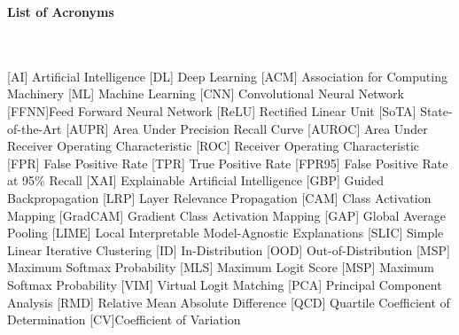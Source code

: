 \documentclass[UKenglish]{uiomasterthesis} %
\theoremstyle{definition}
\begin{document}


\tableofcontents{}

\newpage

\thispagestyle{plain}
{\noindent \Huge {}\selectfont \textbf{List of Acronyms}}
\\
\\
\\

\begin{acronym}[ICANN]
       [AI]   {Artificial Intelligence}
       [DL]   {Deep Learning}
     [ACM] {Association for Computing Machinery}
       [ML]   {Machine Learning}
       [CNN]   {Convolutional Neural Network}
    [FFNN]{Feed Forward Neural Network}
       [ReLU]   {Rectified Linear Unit}
       [SoTA]   {State-of-the-Art}
       [AUPR]   {Area Under Precision Recall Curve}
       [AUROC]   {Area Under Receiver Operating Characteristic}
       [ROC]   {Receiver Operating Characteristic}
       [FPR]   {False Positive Rate}
       [TPR]   {True Positive Rate}
       [FPR95]   {False Positive Rate at 95\% Recall}
       [XAI]   {Explainable Artificial Intelligence}
       [GBP]   {Guided Backpropagation}
       [LRP]   {Layer Relevance Propagation}
     [CAM] {Class Activation Mapping}
     [GradCAM] {Gradient Class Activation Mapping}
       [GAP]   {Global Average Pooling}
       [LIME]   {Local Interpretable Model-Agnostic Explanations}
     [SLIC] {Simple Linear Iterative Clustering}
     [ID] {In-Distribution}
       [OOD]   {Out-of-Distribution}
       [MSP]   {Maximum Softmax Probability}
       [MLS]   {Maximum Logit Score}
       [MSP]   {Maximum Softmax Probability}
       [VIM]   {Virtual Logit Matching}
       [PCA]   {Principal Component Analysis}
       [RMD]   {Relative Mean Absolute Difference}
       [QCD]   {Quartile Coefficient of Determination}
    [CV]{Coefficient of Variation}
\end{acronym}

\thispagestyle{plain}
\listoffigures{}
\listoftables{}
\end{document}
